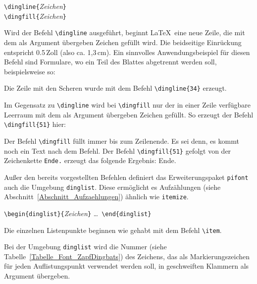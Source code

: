 \documentclass[a4paper,10pt,twoside]{scrbook}
\begin{document}
{\begin{boxedminipage}{\textwidth}
\texttt{\textbackslash dingline\{}\textsl{Zeichen}\texttt{\}} \\
\texttt{\textbackslash dingfill\{}\textsl{Zeichen}\texttt{\}} 
\end{boxedminipage}


Wird der Befehl \verb!\dingline! ausgeführt, beginnt \LaTeX\ eine neue Zeile, die mit dem als Argument übergeben  
Zeichen gefüllt wird. Die beidseitige Einrückung
entspricht 0.5\,Zoll (also ca. 1,3\,cm). Ein sinnvolles Anwendungsbeispiel für diesen Befehl sind Formulare, wo ein Teil des Blattes 
abgetrennt werden soll, beispielsweise so: 


Die Zeile mit den Scheren wurde mit dem Befehl \verb!\dingline{34}! erzeugt.

Im Gegensatz zu \verb!\dingline! wird bei \verb!\dingfill! nur der 
in einer Zeile verfügbare Leerraum mit dem als Argument übergeben  
Zeichen gefüllt. So erzeugt der Befehl \verb!\dingfill{51}! hier: 

Der Befehl \verb!\dingfill! füllt immer bis zum Zeilenende.
Es sei denn, es kommt noch ein Text nach dem Befehl. 
Der Befehl \verb!\dingfill{51}! gefolgt von der Zeichenkette \verb!Ende.! erzeugt das folgende Ergebnis:  Ende. 

Außer den bereits vorgestellten Befehlen definiert das Erweiterungspaket \verb!pifont! auch die Umgebung
\verb!dinglist!. Diese ermöglicht es Aufzählungen (siehe Abschnitt~\ref{Abschnitt_Aufzaehlungen})
ähnlich wie \verb!itemize!. 


\begin{boxedminipage}{\textwidth}
\texttt{\textbackslash begin\{dinglist\}\{}\textsl{Zeichen}\texttt{\}}  \enskip \dots\ \enskip \texttt{\textbackslash end\{dinglist\}} 
\end{boxedminipage}

Die einzelnen Listenpunkte beginnen wie gehabt mit dem Befehl \verb!\item!.

Bei der Umgebung \verb!dinglist! wird die Nummer (siehe Tabelle~\ref{Tabelle_Font_ZapfDingbats}) des Zeichens, das als Markierungszeichen für jeden Auflistungspunkt verwendet werden soll, in geschweiften Klammern als Argument übergeben.


}
\end{document}
